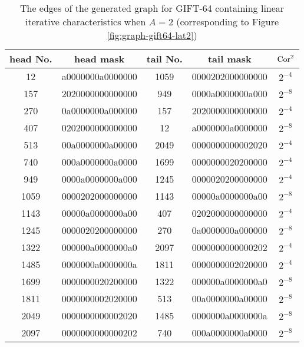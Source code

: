 \begin{table}
	\caption{The edges of the generated graph for GIFT-64 containing linear iterative characteristics when $A=2$ (corresponding to Figure \ref{fig:graph-gift64-lat2})}\label{tab:dis-gift64-lat2}
	\centering
	\begin{tabular}{|c|c|c|c|c|}
		\hline
		head No. & head mask & tail No. & tail mask & $\text{Cor}^2$ \\
		\hline
		12 & a0000000a0000000 & 1059 & 0000202000000000 & $2^{-4}$ \\
        157 & 2020000000000000 & 949 & 0000a0000000a000 & $2^{-8}$ \\
        270 & 0a0000000a000000 & 157 & 2020000000000000 & $2^{-4}$ \\
        407 & 0202000000000000 & 12 & a0000000a0000000 & $2^{-8}$ \\
        513 & 00a0000000a00000 & 2049 & 0000000000002020 & $2^{-4}$ \\
        740 & 000a0000000a0000 & 1699 & 0000000020200000 & $2^{-4}$ \\
        949 & 0000a0000000a000 & 1245 & 0000020200000000 & $2^{-4}$ \\
        1059 & 0000202000000000 & 1143 & 00000a0000000a00 & $2^{-8}$ \\
        1143 & 00000a0000000a00 & 407 & 0202000000000000 & $2^{-4}$ \\
        1245 & 0000020200000000 & 270 & 0a0000000a000000 & $2^{-8}$ \\
        1322 & 000000a0000000a0 & 2097 & 0000000000000202 & $2^{-4}$ \\
        1485 & 0000000a0000000a & 1811 & 0000000002020000 & $2^{-4}$ \\
        1699 & 0000000020200000 & 1322 & 000000a0000000a0 & $2^{-8}$ \\
        1811 & 0000000002020000 & 513 & 00a0000000a00000 & $2^{-8}$ \\
        2049 & 0000000000002020 & 1485 & 0000000a0000000a & $2^{-8}$ \\
        2097 & 0000000000000202 & 740 & 000a0000000a0000 & $2^{-8}$ \\
		\hline
	\end{tabular}
\end{table}